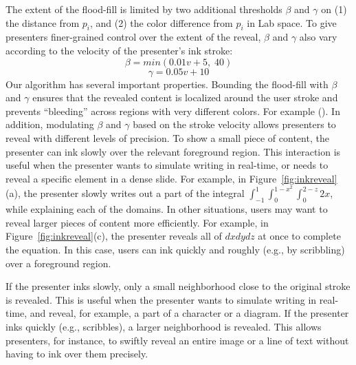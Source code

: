 The extent of the flood-fill is limited by two additional thresholds $\beta$ and $\gamma$ on (1) the distance from $p_i$, and (2) the color difference from $p_i$ in Lab space. 
%
To give presenters finer-grained control over the extent of the reveal, $\beta$ and $\gamma$ also vary according to the velocity of the presenter's ink stroke: 
\begin{equation}
    \beta = min(0.01v+5,\;40)
\end{equation}
%
\begin{equation}
\gamma = 0.05v+10
\end{equation}
Our algorithm has several important properties. Bounding the flood-fill with $\beta$ and $\gamma$ ensures that the revealed content is localized around the user stroke and prevents ``bleeding'' across regions with very different colors. For example (). 
%
In addition, modulating $\beta$ and $\gamma$ based on the stroke velocity allows presenters to reveal with different levels of precision. 
%
To show a small piece of content, the presenter can ink slowly over the relevant foreground region. This interaction is useful when the presenter wants to simulate writing in real-time, or needs to reveal a specific element in a dense slide. For example, in Figure~\ref{fig:inkreveal}(a), the presenter slowly writes out a part of the integral $\int_{-1}^{1}\int_{0}^{1-x^2}\int_{0}^{2-z}2x$, while explaining each of the domains.
%
In other situations, users may want to reveal larger pieces of content more efficiently. For example, in Figure~\ref{fig:inkreveal}(c), the presenter reveals all of $dxdydz$ at once to complete the equation. In this case, users can ink quickly and roughly (e.g., by scribbling) over a foreground region.


If the presenter inks slowly, only a small neighborhood close to the original stroke is revealed. This is useful when the presenter wants to simulate writing in real-time, and reveal, for example, a part of a character or a diagram.
%
If the presenter inks quickly (e.g., scribbles), a larger neighborhood is revealed. This allows presenters, for instance, to swiftly reveal an entire image or a line of text without having to ink over them precisely.   
\fi


